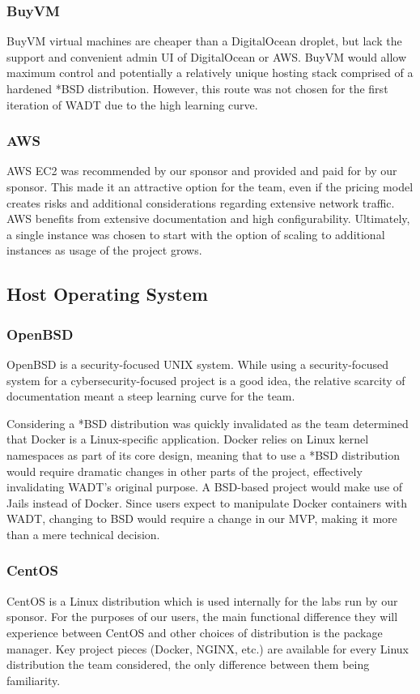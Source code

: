 \documentclass[12pt,titlepage]{article}
\begin{document}
\subsubsection{BuyVM}
BuyVM virtual machines are cheaper than a DigitalOcean droplet, but lack the support and convenient admin UI of DigitalOcean or AWS. BuyVM would allow maximum control and potentially a relatively unique hosting stack comprised of a hardened *BSD distribution. However, this route was not chosen for the first iteration of WADT due to the high learning curve.

\subsubsection{AWS}
AWS EC2 was recommended by our sponsor and provided and paid for by our sponsor. This made it an attractive option for the team, even if the pricing model creates risks and additional considerations regarding extensive network traffic. AWS benefits from extensive documentation and high configurability. Ultimately, a single instance was chosen to start with the option of scaling to additional instances as usage of the project grows.

\subsection{Host Operating System}
\subsubsection{OpenBSD}
OpenBSD is a security-focused UNIX system. While using a security-focused system for a cybersecurity-focused project is a good idea, the relative scarcity of documentation meant a steep learning curve for the team.

Considering a *BSD distribution was quickly invalidated as the team determined that Docker is a Linux-specific application. Docker relies on Linux kernel namespaces as part of its core design, meaning that to use a *BSD distribution would require dramatic changes in other parts of the project, effectively invalidating WADT's original purpose. A BSD-based project would make use of Jails instead of Docker. Since users expect to manipulate Docker containers with WADT, changing to BSD would require a change in our MVP, making it more than a mere technical decision.

\subsubsection{CentOS}
CentOS is a Linux distribution which is used internally for the labs run by our sponsor. For the purposes of our users, the main functional difference they will experience between CentOS and other choices of distribution is the package manager. Key project pieces (Docker, NGINX, etc.) are available for every Linux distribution the team considered, the only difference between them being familiarity.
\end{document}
